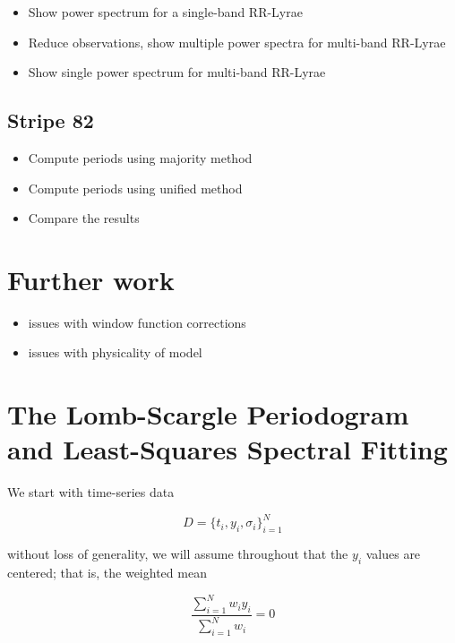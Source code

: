 \documentclass[12pt,preprint]{aastex}
\begin{document}
\begin{itemize}
  \item Show power spectrum for a single-band RR-Lyrae
  \item Reduce observations, show multiple power spectra for multi-band RR-Lyrae
  \item Show single power spectrum for multi-band RR-Lyrae
\end{itemize}

\subsection{Stripe 82}

\begin{itemize}
  \item Compute periods using majority method
  \item Compute periods using unified method
  \item Compare the results
\end{itemize}

\section{Further work}

\begin{itemize}
  \item issues with window function corrections
  \item issues with physicality of model
\end{itemize}






\appendix


\section{The Lomb-Scargle Periodogram and Least-Squares Spectral Fitting}

We start with time-series data

\begin{equation}
  D = \{t_i,y_i,\sigma_i\}_{i=1}^N
\end{equation}

without loss of generality, we will assume throughout that the $y_i$ values are centered; that is, the weighted mean

\begin{equation}
  \label{eq:centered-data}
  \frac{\sum_{i=1}^N w_i y_i}{\sum_{i=1}^N w_i} = 0
\end{equation}
\end{document}
